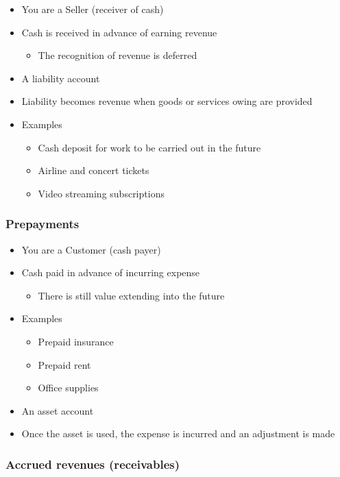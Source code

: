 \documentclass{article}
\begin{document}
			\begin{itemize}
				\item You are a Seller (receiver of cash)
				\item Cash is received in advance of earning revenue
					\begin{itemize}
						\item The recognition of revenue is deferred
					\end{itemize}
				\item \colorbox{pastel_red}{A liability account}
				\item Liability becomes revenue when goods or services owing are provided
				\item Examples
					\begin{itemize}
						\item Cash deposit for work to be carried out in the future
						\item Airline and concert tickets
						\item Video streaming subscriptions
					\end{itemize}
			\end{itemize}

		\subsubsection{Prepayments}
		
			\begin{itemize}
				\item You are a Customer (cash payer)
				\item Cash paid in advance of incurring expense
					\begin{itemize}
						\item There is still value extending into the future
					\end{itemize}
				\item Examples
					\begin{itemize}
						\item Prepaid insurance
						\item Prepaid rent
						\item Office supplies
					\end{itemize}
				\item \colorbox{pastel_green}{An asset account}
				\item Once the asset is used, the expense is incurred and an adjustment is made
			\end{itemize}

		\subsubsection{Accrued revenues (receivables)}
\end{document}
